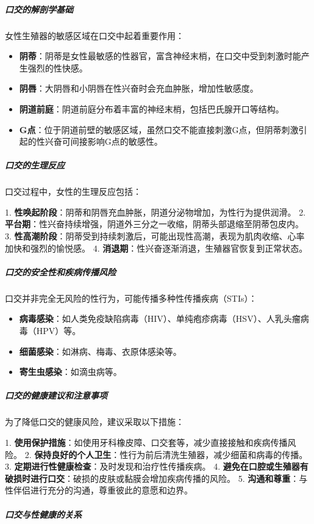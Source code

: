 \documentclass[12pt,UTF8]{ctexbook}
\begin{document}
\subparagraph{口交的解剖学基础}

女性生殖器的敏感区域在口交中起着重要作用：

\begin{itemize}
	\item \textbf{阴蒂}：阴蒂是女性最敏感的性器官，富含神经末梢，在口交中受到刺激时能产生强烈的性快感。
	\item \textbf{阴唇}：大阴唇和小阴唇在性兴奋时会充血肿胀，增加性敏感度。
	\item \textbf{阴道前庭}：阴道前庭分布着丰富的神经末梢，包括巴氏腺开口等结构。
	\item \textbf{G点}：位于阴道前壁的敏感区域，虽然口交不能直接刺激G点，但阴蒂刺激引起的性兴奋可间接影响G点的敏感性。
\end{itemize}

\subparagraph{口交的生理反应}

口交过程中，女性的生理反应包括：

1. \textbf{性唤起阶段}：阴蒂和阴唇充血肿胀，阴道分泌物增加，为性行为提供润滑。
2. \textbf{平台期}：性兴奋持续增强，阴道外三分之一收缩，阴蒂头部退缩至阴蒂包皮内。
3. \textbf{性高潮阶段}：阴蒂受到持续刺激后，可能出现性高潮，表现为肌肉收缩、心率加快和强烈的愉悦感。
4. \textbf{消退期}：性兴奋逐渐消退，生殖器官恢复到正常状态。

\subparagraph{口交的安全性和疾病传播风险}

口交并非完全无风险的性行为，可能传播多种性传播疾病（STIs）：

\begin{itemize}
	\item \textbf{病毒感染}：如人类免疫缺陷病毒（HIV）、单纯疱疹病毒（HSV）、人乳头瘤病毒（HPV）等。
	\item \textbf{细菌感染}：如淋病、梅毒、衣原体感染等。
	\item \textbf{寄生虫感染}：如滴虫病等。
\end{itemize}

\subparagraph{口交的健康建议和注意事项}

为了降低口交的健康风险，建议采取以下措施：

1. \textbf{使用保护措施}：如使用牙科橡皮障、口交套等，减少直接接触和疾病传播风险。
2. \textbf{保持良好的个人卫生}：性行为前后清洗生殖器，减少细菌和病毒的传播。
3. \textbf{定期进行性健康检查}：及时发现和治疗性传播疾病。
4. \textbf{避免在口腔或生殖器有破损时进行口交}：破损的皮肤或黏膜会增加疾病传播的风险。
5. \textbf{沟通和尊重}：与性伴侣进行充分的沟通，尊重彼此的意愿和边界。

\subparagraph{口交与性健康的关系}
\end{document}
